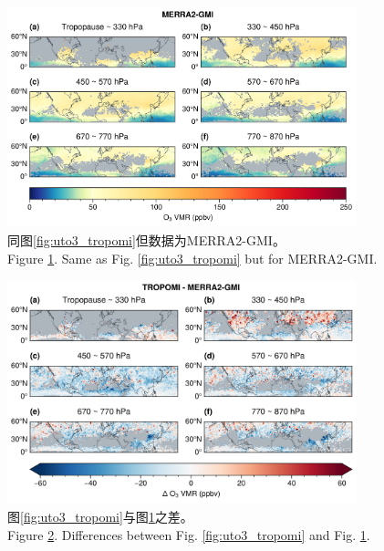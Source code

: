\clearpage\vspace*{\fill}
\begin{figure}[H]
    \centering
    \includegraphics[width=0.9\textwidth]{./figures/uto3_merra2-gmi.png}
    \caption{
    同图\ref{fig:uto3_tropomi}但数据为MERRA2-GMI。 \\
    Figure \ref{fig:uto3_merra2}. Same as Fig. \ref{fig:uto3_tropomi} but for MERRA2-GMI.
    }
    \label{fig:uto3_merra2}
\end{figure}


\begin{figure}[H]
    \centering
    \includegraphics[width=0.9\textwidth]{./figures/uto3_delta.png}
    \caption{
    图\ref{fig:uto3_tropomi}与图\ref{fig:uto3_merra2}之差。 \\
    Figure \ref{fig:uto3_delta}. Differences between Fig. \ref{fig:uto3_tropomi} and Fig. \ref{fig:uto3_merra2}.
    }
    \label{fig:uto3_delta}
\end{figure}
\vspace*{\fill}\clearpage

